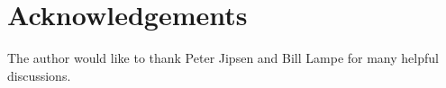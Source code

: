 \section*{Acknowledgements}
The author would like to thank Peter Jipsen
and Bill Lampe for many helpful discussions.



\printbibliography
























